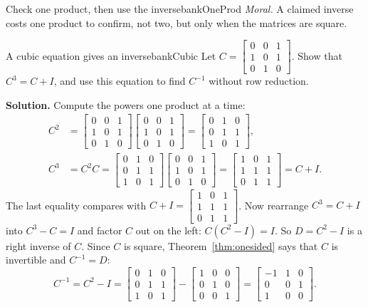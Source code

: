 \documentclass[11pt]{article}
\begin{document}
\begin{exmp}{Check one product, then use the inverse}{bankOneProd}
\emph{Moral.} A claimed inverse costs one product to confirm, not two, but only when the matrices are square.
\end{exmp}

\begin{exmp}{A cubic equation gives an inverse}{bankCubic}
Let $C=\begin{bmatrix}0&0&1\\1&0&1\\0&1&0\end{bmatrix}$. Show that $C^3=C+I$, and use this equation to find $C^{-1}$ without row reduction.

\textbf{Solution.} Compute the powers one product at a time:
\begin{align*}
C^2&=\begin{bmatrix}0&0&1\\1&0&1\\0&1&0\end{bmatrix}\begin{bmatrix}0&0&1\\1&0&1\\0&1&0\end{bmatrix}=\begin{bmatrix}0&1&0\\0&1&1\\1&0&1\end{bmatrix},\\
C^3&=C^2C=\begin{bmatrix}0&1&0\\0&1&1\\1&0&1\end{bmatrix}\begin{bmatrix}0&0&1\\1&0&1\\0&1&0\end{bmatrix}=\begin{bmatrix}1&0&1\\1&1&1\\0&1&1\end{bmatrix}=C+I.
\end{align*}
The last equality compares with $C+I=\begin{bmatrix}1&0&1\\1&1&1\\0&1&1\end{bmatrix}$. Now rearrange $C^3=C+I$ into $C^3-C=I$ and factor $C$ out on the left: $C(C^2-I)=I$. So $D=C^2-I$ is a right inverse of $C$. Since $C$ is square, Theorem~\ref{thm:onesided} says that $C$ is invertible and $C^{-1}=D$:
\[
C^{-1}=C^2-I=\begin{bmatrix}0&1&0\\0&1&1\\1&0&1\end{bmatrix}-\begin{bmatrix}1&0&0\\0&1&0\\0&0&1\end{bmatrix}=\begin{bmatrix}-1&1&0\\0&0&1\\1&0&0\end{bmatrix}.
\]
\end{exmp}
\end{document}
